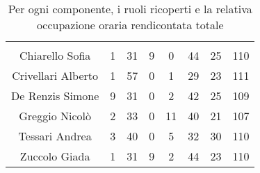 \begin{table}[H]
	\begin{center}
		\begin{tabular}{c
				!{\color[HTML]{9b240a}\vrule width 1pt}
				cccccc
				!{\color[HTML]{9b240a}\vrule width 1pt}	
				c}
			\rowcolorhead
			 &  &  &  &  &  &  &  \\
			
			Chiarello Sofia & 1 & 31 & 9 & 0 & 44 & 25 & 110\\
			Crivellari Alberto & 1 & 57 & 0 & 1 & 29 & 23 & 111\\
			De Renzis Simone & 9 & 31 & 0 & 2 & 42 & 25 & 109\\
			Greggio Nicolò & 2 & 33 & 0 & 11 & 40 & 21 & 107\\
			Tessari Andrea & 3 & 40 & 0 & 5 & 32 & 30 & 110\\
			Zuccolo Giada & 1 & 31 & 9 & 2 & 44 & 23 & 110\\
		\end{tabular}
		\caption[Occupazione oraria totale rendicontata]{Per ogni componente, i ruoli ricoperti e la relativa occupazione oraria rendicontata totale}
	\end{center}
\end{table}



